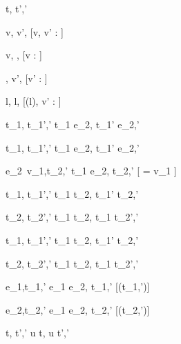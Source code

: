   {t,\sigma {} t',\sigma'}

  { }
  {\Edit v,\sigma {} \Edit v',\sigma}
  [v, v' : \tau]

  { }
  {\Edit v,\sigma \handle{\Empty} \Enter \tau,\sigma}
  [v : \tau]

  { }
  {\Enter \tau,\sigma {} \Edit v',\sigma}
  [v' : \tau]

  { }
  {\Update l,\sigma {} \Update l,\sigma[l \mapsto v']{}}
  [\sigma(l), v' : \tau]


  {t_1,\sigma {} t_1',\sigma'}
  {t_1 \Then e_2,\sigma {} t_1' \Then e_2,\sigma'}

  {t_1,\sigma {} t_1',\sigma'}
  {t_1 \Next e_2,\sigma {} t_1' \Next e_2,\sigma'}

  {e_2\ v_1,\sigma \normalise t_2,\sigma'}
  {t_1 \Next e_2,\sigma \handle{\Continue} t_2,\sigma'}
  [ = v_1 \wedge \neg{}]


  {t_1,\sigma {} t_1',\sigma' }
  {t_1 \And t_2,\sigma {} t_1' \And t_2,\sigma'}

  {t_2,\sigma {} t_2',\sigma'}
  {t_1 \And t_2,\sigma {} t_1 \And t_2',\sigma'}


  {t_1,\sigma {} t_1',\sigma'}
  {t_1 \Or t_2,\sigma {} t_1' \Or t_2,\sigma'}

  {t_2,\sigma {} t_2',\sigma' }
  {t_1 \Or t_2,\sigma {} t_1 \Or t_2',\sigma'}


  {e_1,\sigma \normalise t_1,\sigma'}
  {e_1 \Xor e_2,\sigma \handle{\Left} t_1,\sigma'}
  [\neg\Failing(t_1,\sigma')]

  {e_2,\sigma \normalise t_2,\sigma'}
  {e_1 \Xor e_2,\sigma \handle{\Right} t_2,\sigma'}
  [\neg\Failing(t_2,\sigma')]


  {t,\sigma {} t',\sigma'}
  {u \At t,\sigma{} u \At t',\sigma'}






